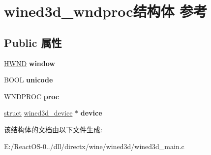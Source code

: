 \hypertarget{structwined3d__wndproc}{}\section{wined3d\+\_\+wndproc结构体 参考}
\label{structwined3d__wndproc}
\subsection*{Public 属性}
\begin{DoxyCompactItemize}
\item 
\mbox{\label{structwined3d__wndproc_a920605e8b6900b03656f06b9c00cca87}} 
\hyperlink{interfacevoid}{H\+W\+ND} {\bfseries window}
\item 
\mbox{\label{structwined3d__wndproc_a203abcfdf35c3b1b4188103359398f0b}} 
B\+O\+OL {\bfseries unicode}
\item 
\mbox{\label{structwined3d__wndproc_a3020ffba66c6c8f87a342d7f7055e3c3}} 
W\+N\+D\+P\+R\+OC {\bfseries proc}
\item 
\mbox{\label{structwined3d__wndproc_ac5a79e58081b39c18e36463a7053409d}} 
\hyperlink{interfacestruct}{struct} \hyperlink{structwined3d__device}{wined3d\+\_\+device} $\ast$ {\bfseries device}
\end{DoxyCompactItemize}


该结构体的文档由以下文件生成\+:\begin{DoxyCompactItemize}
\item 
E\+:/\+React\+O\+S-\/0../dll/directx/wine/wined3d/wined3d\+\_\+main.\+c\end{DoxyCompactItemize}
